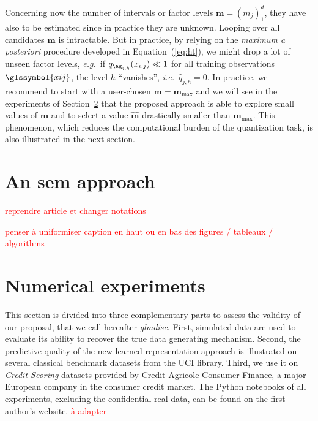 Concerning now the number of intervals or factor levels $\boldsymbol{m} = (m_j)_1^d$, they have also to be estimated since in practice they are unknown. Looping over all candidates $\boldsymbol{m}$ is intractable. But in practice, by relying on the \textit{maximum a posteriori} procedure developed in Equation~(\ref{eq:ht}), we might drop a lot of unseen factor levels, \textit{e.g.}\ if $q_{\ag_{j,h}}(x_{i,j}) \ll 1$ for all training observations $\glssymbol{xij}$, the level $h$ ``vanishes'', \textit{i.e.}\ $\hat{q}_{j,h} = 0$. In practice, we recommend to start with a user-chosen $\bm{m}=\boldsymbol{m}_{\max}$ and we will see in the experiments of Section~\ref{sec:experiments} that the proposed approach is able to explore small values of $\boldsymbol{m}$ and to select a value $\hat{\boldsymbol{m}}$ drastically smaller than $\boldsymbol{m}_{\max}$. This phenomenon, which reduces the computational burden of the quantization task, is also illustrated in the next section.




\section{An \gls{sem} approach} \label{sec:sem}
 
 
 \textcolor{red}{reprendre article et changer notations}
 
 \textcolor{red}{penser à uniformiser caption en haut ou en bas des figures / tableaux / algorithms}









 
 
 \section{Numerical experiments} \label{sec:experiments}

This section is divided into three complementary parts to assess the validity of our proposal, that we call hereafter \textit{glmdisc}. First, simulated data are used to evaluate its ability to recover the true data generating mechanism. Second, the predictive quality of the new learned representation approach is illustrated on several classical benchmark datasets from the UCI library. Third, we use it on \textit{Credit Scoring} datasets provided by Credit Agricole Consumer Finance, a major European company in the consumer credit market. The Python notebooks of all experiments, excluding the confidential real data, can be found on the first author's website. \textcolor{red}{à adapter}


